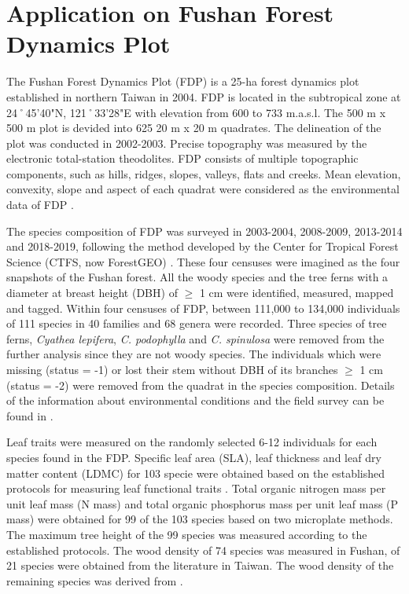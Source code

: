 \section{Application on Fushan Forest Dynamics Plot}
\noindent
The Fushan Forest Dynamics Plot (FDP) is a 25-ha forest dynamics plot established in northern Taiwan in 2004. FDP is located in the subtropical zone at 24˚45'40"N, 121˚33'28"E with elevation from 600 to 733 m.a.s.l. The 500 m x 500 m plot is devided into 625 20 m x 20 m quadrates. The delineation of the plot was conducted in 2002-2003. Precise topography was measured by the electronic total-station theodolites. FDP consists of multiple topographic components, such as hills, ridges, slopes, valleys, flats and creeks. Mean elevation, convexity, slope and aspect of each quadrat were considered as the environmental data of FDP \citep{su2007fushan}. 

The species composition of FDP was surveyed in 2003-2004, 2008-2009, 2013-2014 and 2018-2019, following the method developed by the Center for Tropical Forest Science (CTFS, now ForestGEO) \citep{condit1998tropical}. These four censuses were imagined as the four snapshots of the Fushan forest. All the woody species and the tree ferns with a diameter at breast height (DBH) of $\geq$ 1 cm were identified, measured, mapped and tagged. Within four censuses of FDP, between 111,000 to 134,000 individuals of 111 species in 40 families and 68 genera were recorded. Three species of tree ferns, \textit{Cyathea lepifera}, \textit{C. podophylla} and \textit{C. spinulosa} were removed from the further analysis since they are not woody species. The individuals which were missing (status = -1) or lost their stem without DBH of its branches $\geq$ 1 cm (status = -2) were removed from the quadrat in the species composition. Details of the information about environmental conditions and the field survey can be found in \citet{su2007fushan}.

Leaf traits were measured on the randomly selected 6-12 individuals for each species found in the FDP. Specific leaf area (SLA), leaf thickness and leaf dry matter content (LDMC) for 103 specie were obtained based on the established protocols for measuring leaf functional traits \citep{hrguindeguy2013new}. Total organic nitrogen mass per unit leaf mass (N mass) and total organic phosphorus mass per unit leaf mass (P mass) were obtained for 99 of the 103 species based on two microplate methods. The maximum tree height of the 99 species was measured according to the established protocols. The wood density of 74 species was measured in Fushan, of 21 species were obtained from the literature in Taiwan. The wood density of the remaining species was derived from \citet{chave2009towards}.

